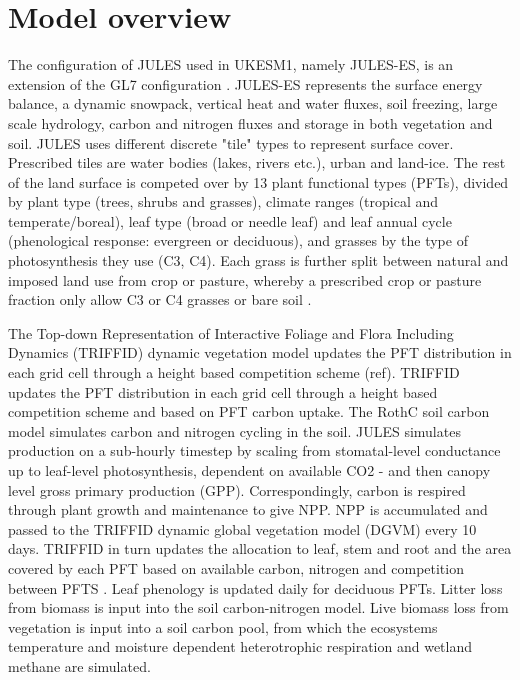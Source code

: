 \section{Model overview}

The configuration of JULES used in UKESM1, namely JULES-ES, is an extension of the GL7 configuration \citep{wiltshire2020gl7}. JULES-ES represents the surface energy balance, a dynamic snowpack, vertical heat and water fluxes, soil freezing, large scale hydrology, carbon and nitrogen fluxes and storage in both vegetation and soil. JULES uses different discrete "tile" types to represent surface cover. Prescribed tiles are water bodies (lakes, rivers etc.), urban and land-ice. The rest of the land surface is competed over by 13 plant functional types (PFTs), divided by plant type (trees, shrubs and grasses), climate ranges (tropical and temperate/boreal), leaf type (broad or needle leaf) and leaf annual cycle (phenological response: evergreen or deciduous), and grasses by the type of photosynthesis they use (C3, C4). Each grass is further split between natural and imposed land use from crop or pasture, whereby a prescribed crop or pasture fraction only allow C3 or C4 grasses or bare soil \citep{robertson2019local}.

The Top-down Representation of Interactive Foliage and Flora Including Dynamics (TRIFFID) dynamic vegetation model updates the PFT distribution in each grid cell through a height based competition scheme (ref). TRIFFID updates the PFT distribution in each grid cell through a height based competition scheme \citep{harper2016improved} and based on PFT carbon uptake. The RothC soil carbon model \cite{clark2011joint} simulates carbon and nitrogen cycling in the soil. JULES simulates production on a sub-hourly timestep by scaling from stomatal-level conductance up to leaf-level photosynthesis, dependent on available CO2 - and then canopy level gross primary production (GPP). Correspondingly, carbon is respired through plant growth and maintenance to give NPP.  NPP is accumulated and passed to the TRIFFID dynamic global vegetation model (DGVM) every 10 days. TRIFFID in turn updates the allocation to leaf, stem and root and the area covered by each PFT based on available carbon, nitrogen and competition between PFTS \citep{wiltshire2020jules}. Leaf phenology is updated daily for deciduous PFTs.  Litter loss from biomass is input into the soil carbon-nitrogen model. Live biomass loss from vegetation is input into a soil carbon pool, from which the ecosystems temperature and moisture dependent heterotrophic respiration and wetland methane are simulated.


